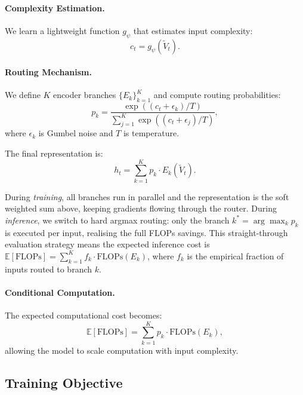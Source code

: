 \documentclass{article}
\begin{document}
\paragraph{Complexity Estimation.}
We learn a lightweight function $g_\psi$ that estimates input complexity:
\begin{equation}
c_t = g_\psi(\tilde{V}_t).
\end{equation}

\paragraph{Routing Mechanism.}
We define $K$ encoder branches $\{E_k\}_{k=1}^{K}$ and compute routing probabilities:
\begin{equation}
p_k = \frac{\exp((c_t + \epsilon_k)/T)}{\sum_{j=1}^{K} \exp((c_t + \epsilon_j)/T)},
\end{equation}
where $\epsilon_k$ is Gumbel noise and $T$ is temperature.

The final representation is:
\begin{equation}
h_t = \sum_{k=1}^{K} p_k \cdot E_k(\tilde{V}_t).
\end{equation}

During \emph{training}, all branches run in parallel and the representation is the soft weighted sum above, keeping gradients flowing through the router. During \emph{inference}, we switch to hard argmax routing: only the branch $k^* = \arg\max_k p_k$ is executed per input, realising the full FLOPs savings. This straight-through evaluation strategy means the expected inference cost is $\mathbb{E}[\text{FLOPs}] = \sum_{k=1}^{K} f_k \cdot \text{FLOPs}(E_k)$, where $f_k$ is the empirical fraction of inputs routed to branch $k$.

\paragraph{Conditional Computation.}
The expected computational cost becomes:
\begin{equation}
\mathbb{E}[\text{FLOPs}] = \sum_{k=1}^{K} p_k \cdot \text{FLOPs}(E_k),
\end{equation}
allowing the model to scale computation with input complexity.

\subsection{Training Objective}
\end{document}
